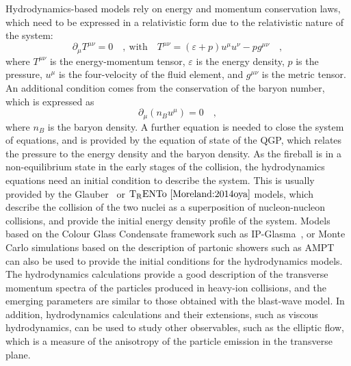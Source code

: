Hydrodynamics-based models rely on energy and momentum conservation laws, which need to be expressed in a relativistic form due to the relativistic nature of the system:
\begin{equation*}
    \partial_\mu T^{\mu\nu} = 0\quad ,~\mathrm{with}\quad T^{\mu\nu} = (\varepsilon + p)u^\mu u^\nu - p g^{\mu\nu}\quad ,
\end{equation*}
where $T^{\mu\nu}$ is the energy-momentum tensor, $\varepsilon$ is the energy density, $p$ is the pressure, $u^\mu$ is the four-velocity of the fluid element, and $g^{\mu\nu}$ is the metric tensor. An additional condition comes from the conservation of the baryon number, which is expressed as
\begin{equation*}
    \partial_\mu (n_B u^\mu) = 0\quad ,
\end{equation*}
where $n_B$ is the baryon density. A further equation is needed to close the system of equations, and is provided by the equation of state of the QGP, which relates the pressure to the energy density and the baryon density. As the fireball is in a non-equilibrium state in the early stages of the collision, the hydrodynamics equations need an initial condition to describe the system. This is usually provided by the Glauber~\cite{Miller:2007ri} or $\mathrm{T_RENTo}~\cite{Moreland:2014oya}$ models, which describe the collision of the two nuclei as a superposition of nucleon-nucleon collisions, and provide the initial energy density profile of the system. Models based on the Colour Glass Condensate framework such as IP-Glasma~\cite{Lappi:2006fp}, or Monte Carlo simulations based on the description of partonic showers such as AMPT~\cite{Lin:2004en} can also be used to provide the initial conditions for the hydrodynamics models. \\
The hydrodynamics calculations provide a good description of the transverse momentum spectra of the particles produced in heavy-ion collisions, and the emerging parameters are similar to those obtained with the blast-wave model. In addition, hydrodynamics calculations and their extensions, such as viscous hydrodynamics, can be used to study other observables, such as the elliptic flow, which is a measure of the anisotropy of the particle emission in the transverse plane.

